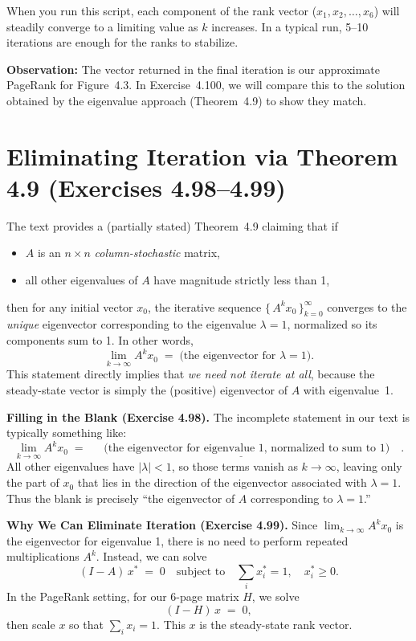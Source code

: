 \documentclass{article}
\begin{document}
\noindent
When you run this script, each component of the rank vector 
(\(x_1, x_2, \ldots, x_6\)) will steadily converge to a limiting value 
as \(k\) increases. In a typical run, 5--10 iterations are enough for 
the ranks to stabilize.
    

\bigskip
\noindent
\textbf{Observation:} The vector returned in the final iteration is our 
approximate PageRank for Figure~4.3. In Exercise~4.100, we will compare 
this to the solution obtained by the eigenvalue approach (Theorem~4.9) 
to show they match.

\newpage

\section{Eliminating Iteration via Theorem 4.9 (Exercises 4.98--4.99)}

\noindent
The text provides a (partially stated) Theorem~4.9 claiming that if
\begin{itemize}
  \item $A$ is an $n\times n$ \emph{column-stochastic} matrix, 
  \item all other eigenvalues of $A$ have magnitude strictly less than 1,
\end{itemize}
then for any initial vector $x_0$, the iterative sequence 
$\{\,A^k x_0\,\}_{k=0}^{\infty}$ converges to the \emph{unique} eigenvector 
corresponding to the eigenvalue $\lambda=1$, normalized so its components sum 
to 1. In other words, 
\[
\lim_{k\to\infty}A^k x_0 \;=\; \text{(the eigenvector for } \lambda=1 \text{)}.
\]
This statement directly implies that \emph{we need not iterate at all}, because 
the steady-state vector is simply the (positive) eigenvector of $A$ with eigenvalue~1.

\bigskip
\noindent
\textbf{Filling in the Blank (Exercise 4.98).}
The incomplete statement in our text is typically something like:
\[
\lim_{k\to\infty} A^k x_0 
\;=\;
\;\underline{\quad \text{(the eigenvector for eigenvalue }1\text{, normalized to sum to }1)}\quad.
\]
All other eigenvalues have $|\lambda|<1$, so those terms vanish as $k\to\infty$, 
leaving only the part of $x_0$ that lies in the direction of the eigenvector 
associated with $\lambda=1$. Thus the blank is precisely ``the eigenvector of $A$ 
corresponding to $\lambda=1$.''

\bigskip
\noindent
\textbf{Why We Can Eliminate Iteration (Exercise 4.99).}
Since $\lim_{k\to\infty} A^k x_0$ is the eigenvector for eigenvalue 1, 
there is no need to perform repeated multiplications $A^k$. Instead, we can solve
\[
(I - A)\,x^* \;=\; 0 
\quad\text{subject to}\quad
\sum_i x_i^* = 1, 
\quad x_i^* \ge 0.
\]
In the PageRank setting, for our 6-page matrix $H$, we solve
\[
(I - H)\,x \;=\; 0,
\]
then scale $x$ so that $\sum_i x_i = 1$. This $x$ is the steady-state rank vector.
\end{document}

